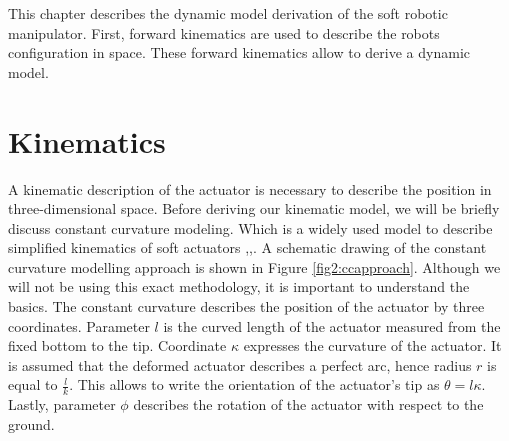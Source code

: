 This chapter describes the dynamic model derivation of the soft robotic manipulator. First, forward kinematics are used to describe the robots configuration in space. These forward kinematics allow to derive a dynamic model. 



\section{Kinematics}

A kinematic description of the actuator is necessary to describe the position in three-dimensional space. Before deriving our kinematic model, we will be briefly discuss constant curvature modeling. Which is a widely used model to describe simplified kinematics of soft actuators \cite{ccapproach},\cite{berkers},\cite{Falkenhahn2015}. A schematic drawing of the constant curvature modelling approach is shown in Figure \ref{fig2:ccapproach}. Although we will not be using this exact methodology, it is important to understand the basics. The constant curvature describes the position of the actuator by three coordinates. Parameter $l$ is the curved length of the actuator measured from the fixed bottom to the tip. Coordinate $\kappa$ expresses the curvature of the actuator. It is assumed that the deformed actuator describes a perfect arc, hence radius $r$ is equal to $\frac{l}{k}$. This allows to write the orientation of the actuator's tip as $\theta = l\kappa$. Lastly, parameter $\phi$ describes the rotation of the actuator with respect to the ground. 



